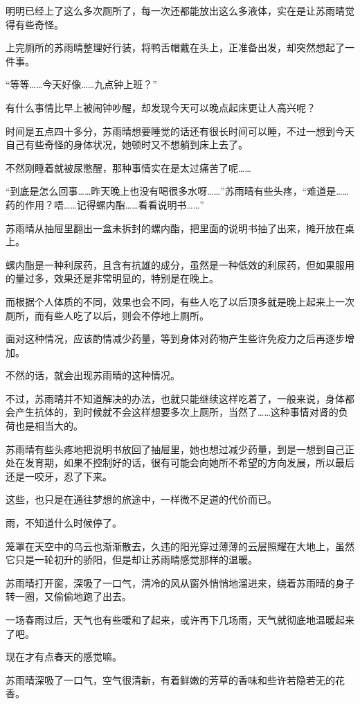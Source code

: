 明明已经上了这么多次厕所了，每一次还都能放出这么多液体，实在是让苏雨晴觉得有些奇怪。

上完厕所的苏雨晴整理好行装，将鸭舌帽戴在头上，正准备出发，却突然想起了一件事。

“等等……今天好像……九点钟上班？”

有什么事情比早上被闹钟吵醒，却发现今天可以晚点起床更让人高兴呢？

时间是五点四十多分，苏雨晴想要睡觉的话还有很长时间可以睡，不过一想到今天自己有些奇怪的身体状况，她顿时又不想躺到床上去了。

不然刚睡着就被尿憋醒，那种事情实在是太过痛苦了呢……

“到底是怎么回事……昨天晚上也没有喝很多水呀……”苏雨晴有些头疼，“难道是……药的作用？唔……记得螺内酯……看看说明书……”

苏雨晴从抽屉里翻出一盒未拆封的螺内酯，把里面的说明书抽了出来，摊开放在桌上。

螺内酯是一种利尿药，且含有抗雄的成分，虽然是一种低效的利尿药，但如果服用的量过多，效果还是非常明显的，特别是在晚上。

而根据个人体质的不同，效果也会不同，有些人吃了以后顶多就是晚上起来上一次厕所，而有些人吃了以后，则会不停地上厕所。

面对这种情况，应该酌情减少药量，等到身体对药物产生些许免疫力之后再逐步增加。

不然的话，就会出现苏雨晴的这种情况。

不过，苏雨晴并不知道解决的办法，也就只能继续这样吃着了，一般来说，身体都会产生抗体的，到时候就不会这样想要多次上厕所，当然了……这种事情对肾的负荷也是相当大的。

苏雨晴有些头疼地把说明书放回了抽屉里，她也想过减少药量，到是一想到自己正处在发育期，如果不控制好的话，很有可能会向她所不希望的方向发展，所以最后还是一咬牙，忍了下来。

这些，也只是在通往梦想的旅途中，一样微不足道的代价而已。

雨，不知道什么时候停了。

笼罩在天空中的乌云也渐渐散去，久违的阳光穿过薄薄的云层照耀在大地上，虽然它只是一轮初升的骄阳，但是却让苏雨晴感觉那样的温暖。

苏雨晴打开窗，深吸了一口气，清冷的风从窗外悄悄地溜进来，绕着苏雨晴的身子转一圈，又偷偷地跑了出去。

一场春雨过后，天气也有些暖和了起来，或许再下几场雨，天气就彻底地温暖起来了吧。

现在才有点春天的感觉嘛。

苏雨晴深吸了一口气，空气很清新，有着鲜嫩的芳草的香味和些许若隐若无的花香。

